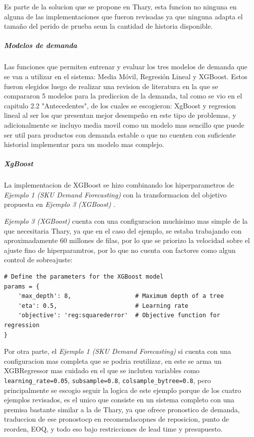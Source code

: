 Es parte de la solucion que se propone en Thary, esta funcion no ninguna en alguna de las implementaciones que fueron revisadas ya que ninguna adapta el tamaño del perido de prueba seun la cantidad de historia disponible. 

\subparagraph{Modelos de demanda}

Las funciones que permiten entrenar y evaluar los tres modelos de demanda que se van a utilizar en el sistema: Media Móvil, Regresión Lineal y XGBoost. Estos fueron elegidos luego de realizar una revision de literatura en la que se compararon 5 modelos para la prediccion de la demanda, tal como se vio en el capitulo 2.2 "Antecedentes", de los cuales se escogieron: XgBoost y regresion lineal al ser los que presentan mejor desempeño en este tipo de problemas, y adicionalmente se incluyo media movil como un modelo mas sencillo que puede ser util para productos con demanda estable o que no cuenten con suficiente historial implementar para un modelo mas complejo.

\subparagraph{XgBoost}

La implementacion de XGBoost se hizo combinando los hiperparametros de \textit{Ejemplo 1 (SKU Demand Forecasting)} \cite{ejemplo1_demandforecast} con la transformacion del objetivo propuesta en \textit{Ejemplo 3 (XGBoost)} \cite{ejemplo3_ksmooi_inventorydemand}.

\textit{Ejemplo 3 (XGBoost)} \cite{ejemplo3_ksmooi_inventorydemand} cuenta con una configuracion muchisimo mas simple de la que necesitaria Thary, ya que en el caso del ejemplo, se estaba trabajando con aproximadamente 60 millones de filas, por lo que se priorizo la velocidad sobre el ajuste fino de hiperparamtros, por lo que no cuenta con factores como algun control de sobreajuste:

\begin{verbatim}
# Define the parameters for the XGBoost model
params = {
    'max_depth': 8,                  # Maximum depth of a tree
    'eta': 0.5,                      # Learning rate
    'objective': 'reg:squarederror'  # Objective function for regression
}
\end{verbatim}

Por otra parte, el \textit{Ejemplo 1 (SKU Demand Forecasting)} \cite{ejemplo1_demandforecast} si cuenta con una configuracion mas completa que se podria reutilizar, en este se arma un XGBRegressor mas cuidado en el que se incluten variables como \texttt{learning\_rate=0.05}, \texttt{subsample=0.8}, \texttt{colsample\_bytree=0.8}, pero principalmente se escogio seguir la logica de este ejemplo porque de los cuatro ejemplos revisados, es el unico que consiste en un sistema completo con una premisa bastante similar a la de Thary, ya que ofrece pronostico de demanda, traduccion de ese pronostocp en recomendacopnes de reposicion, punto de reorden, EOQ, y todo eso bajo restricciones de lead time y presupuesto.


